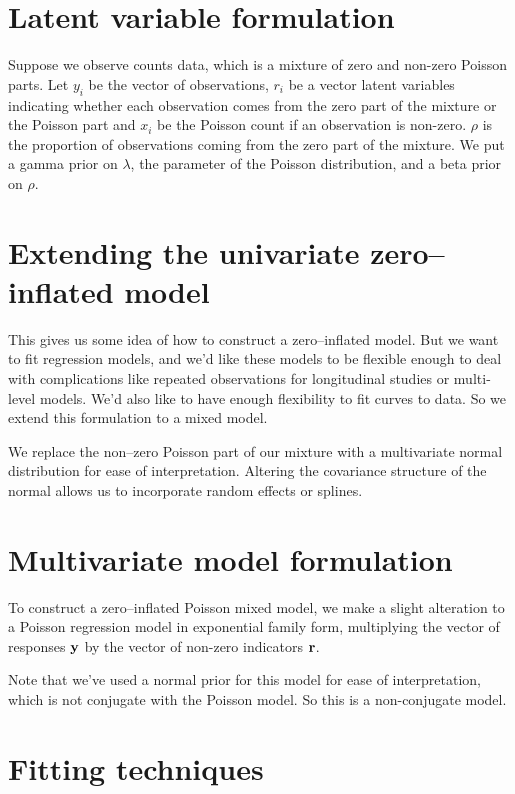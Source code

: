 \documentclass{amsart}
\begin{document}
\section{Latent variable formulation}

Suppose we observe counts data, which is a mixture of zero and non-zero Poisson parts. Let $y_i$ be the vector
of observations, $r_i$ be a vector latent variables indicating whether each observation comes from the zero
part of the mixture or the Poisson part and $x_i$ be the Poisson count if an observation is non-zero. $\rho$
is the proportion of observations coming from the zero part of the mixture. We put a gamma prior on $\lambda$,
the parameter of the Poisson distribution, and a beta prior on $\rho$.

\section{Extending the univariate zero--inflated model}

This gives us some idea of how to construct a zero--inflated model. But we want to fit regression models, and
we'd like these models to be flexible enough to deal with complications like repeated observations for
longitudinal studies or multi-level models. We'd also like to have enough flexibility to fit curves to data. So
we extend this formulation to a mixed model.

We replace the non--zero Poisson part of our mixture with a multivariate normal distribution for ease of
interpretation. Altering the covariance structure of the normal allows us to incorporate random effects or
splines.

\section{Multivariate model formulation}

To construct a zero--inflated Poisson mixed model, we make a slight alteration to a Poisson regression model
in exponential family form, multiplying the vector of responses ${\bf y}$ by the vector of non-zero indicators
${\bf r}$.

Note that we've used a normal prior for this model for ease of interpretation, which is not conjugate with the
Poisson model. So this is a non-conjugate model.

\section{Fitting techniques}
\end{document}
